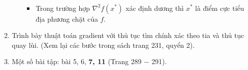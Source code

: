 \documentclass[12pt]{article}
\begin{document}
\begin{enumerate}
\begin{itemize}
\begin{itemize}
\begin{align*}
			\end{align*}
			\item Trong trường hợp $\nabla^2 f(x^*)$ xác định dương thì $x^*$ là điểm cực tiểu địa phương chặt của $f$.
		\end{itemize}
	\end{itemize}
	\item Trình bày thuật toán gradient với thủ tục tìm chính xác theo tia và thủ tục quay lùi. (Xem lại các bước trong sách trang 231, quyển 2).
	\item[]
		\begin{tcolorbox}
			Một số bài tập: bài 5, 6, \textbf{7, 11} (Trang 289 $-$ 291).
		\end{tcolorbox}
\end{enumerate}
\end{document}
